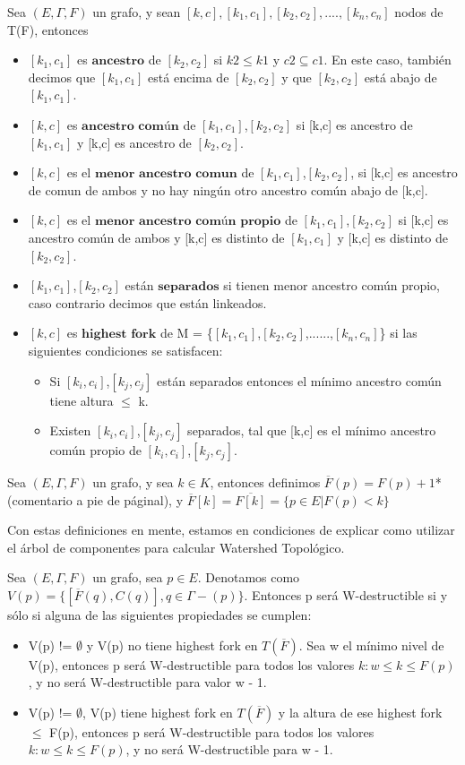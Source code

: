 Sea $(E,\Gamma,F)$ un grafo, y sean $[k,c], [k_1,c_1], [k_2,c_2], .... , [k_n,c_n]$ nodos de T(F), entonces

\begin{itemize}
  \item $[k_1,c_1]$ es $\textbf{ancestro}$ de $[k_2,c_2]$ si $k2 \le k1$ y $c2 \subseteq c1$. En este caso, también decimos que $[k_1,c_1]$ está encima de $[k_2,c_2]$ y que $[k_2,c_2]$ está abajo de $[k_1,c_1]$.
  \item $[k,c]$ es $\textbf{ancestro común}$ de $[k_1,c_1]$,$[k_2,c_2]$ si [k,c] es ancestro de $[k_1,c_1]$ y [k,c] es ancestro de $[k_2,c_2]$.
  \item $[k,c]$ es el $\textbf{menor ancestro comun}$ de $[k_1,c_1]$,$[k_2,c_2]$, si [k,c] es ancestro de comun de ambos y no hay ningún otro ancestro común abajo de [k,c].
  \item $[k,c]$ es el $\textbf{menor ancestro común propio}$ de $[k_1,c_1]$,$[k_2,c_2]$ si [k,c] es ancestro común de ambos y [k,c] es distinto de $[k_1,c_1]$ y [k,c] es distinto de $[k_2,c_2]$.
  \item $[k_1,c_1]$,$[k_2,c_2]$ están $\textbf{separados}$ si tienen menor ancestro común propio, caso contrario decimos que están linkeados.
  \item $[k,c]$ es $\textbf{highest fork}$ de M = \{$[k_1,c_1]$,$[k_2,c_2]$,......,$[k_n,c_n]$\} si las siguientes condiciones se satisfacen:
  \begin{itemize}
    \item Si $[k_i,c_i]$,$[k_j,c_j]$ están separados entonces el mínimo ancestro común tiene altura $\le$ k.
    \item Existen $[k_i,c_i]$,$[k_j,c_j]$ separados, tal que [k,c] es el mínimo ancestro común propio de $[k_i,c_i]$,$[k_j,c_j]$. 
  \end{itemize}
\end{itemize}

Sea $(E,\Gamma,F)$ un grafo, y sea $k \in K$, entonces definimos $\overline{F}(p) = F(p) + 1$*(comentario a pie de páginal), y $\overline{F}[k] = \overline{F[k]} = \{ p \in E | F(p) < k \}$
 
Con estas definiciones en mente, estamos en condiciones de explicar como utilizar el árbol de componentes para calcular Watershed Topológico.

Sea  $(E,\Gamma,F)$  un grafo, sea $p \in E$. Denotamos como $V(p) = \{[\overline{F}(q),C(q)], q \in \Gamma-(p)\}$. Entonces p será W-destructible si y sólo si alguna de las siguientes propiedades se cumplen:
\begin{itemize}
  \item V(p) != $\emptyset$ y V(p) no tiene highest fork en $T(\overline{F})$. Sea w el mínimo nivel de V(p), entonces p será W-destructible para todos los valores $k: w \leq k \leq F(p)$, y no será W-destructible para valor w - 1.
  \item V(p) != $\emptyset$, V(p) tiene highest fork en $T(\overline{F})$ y la altura de ese highest fork $\leq$ F(p), entonces p será W-destructible para todos los valores $k: w \leq k \leq F(p)$, y no será W-destructible para w - 1.
\end{itemize}
  
